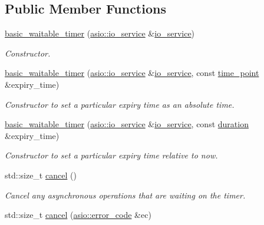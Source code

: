 \subsection*{Public Member Functions}
\begin{DoxyCompactItemize}
\item 
\hyperlink{classasio_1_1basic__waitable__timer_ac26429a677a85a41fd420879252772df}{basic\+\_\+waitable\+\_\+timer} (\hyperlink{classasio_1_1io__service}{asio\+::io\+\_\+service} \&\hyperlink{classasio_1_1io__service}{io\+\_\+service})
\begin{DoxyCompactList}\small\item\em Constructor. \end{DoxyCompactList}\item 
\hyperlink{classasio_1_1basic__waitable__timer_a407740462725395ffb072104736b769f}{basic\+\_\+waitable\+\_\+timer} (\hyperlink{classasio_1_1io__service}{asio\+::io\+\_\+service} \&\hyperlink{classasio_1_1io__service}{io\+\_\+service}, const \hyperlink{classasio_1_1basic__waitable__timer_a6f5aadc1aba86956b544ce107cfb49b0}{time\+\_\+point} \&expiry\+\_\+time)
\begin{DoxyCompactList}\small\item\em Constructor to set a particular expiry time as an absolute time. \end{DoxyCompactList}\item 
\hyperlink{classasio_1_1basic__waitable__timer_ac3d4118b5f6ca81428fb3b78f4ec75ae}{basic\+\_\+waitable\+\_\+timer} (\hyperlink{classasio_1_1io__service}{asio\+::io\+\_\+service} \&\hyperlink{classasio_1_1io__service}{io\+\_\+service}, const \hyperlink{classasio_1_1basic__waitable__timer_a3ab0ae5bdf928106cd6ea19fcd4f5d49}{duration} \&expiry\+\_\+time)
\begin{DoxyCompactList}\small\item\em Constructor to set a particular expiry time relative to now. \end{DoxyCompactList}\item 
std\+::size\+\_\+t \hyperlink{classasio_1_1basic__waitable__timer_aaff6cc75a851b177f1c778c50a4e678a}{cancel} ()
\begin{DoxyCompactList}\small\item\em Cancel any asynchronous operations that are waiting on the timer. \end{DoxyCompactList}\item 
std\+::size\+\_\+t \hyperlink{classasio_1_1basic__waitable__timer_ad599f3eecd4f649cf1241d6e4c383f18}{cancel} (\hyperlink{classasio_1_1error__code}{asio\+::error\+\_\+code} \&ec)

\end{DoxyCompactItemize}
